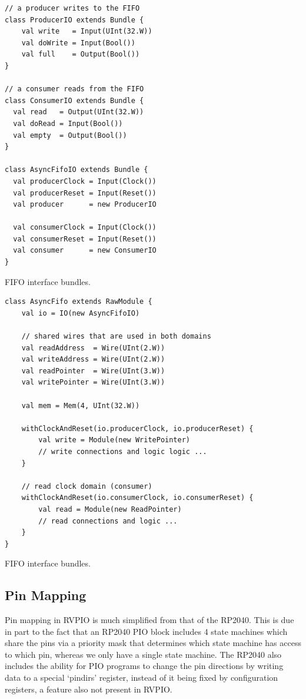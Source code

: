 \begin{listing}[h!]
    \vspace{0.5cm}
    \begin{verbatim}
// a producer writes to the FIFO
class ProducerIO extends Bundle {
    val write   = Input(UInt(32.W))
    val doWrite = Input(Bool())
    val full    = Output(Bool())
}

// a consumer reads from the FIFO
class ConsumerIO extends Bundle {
  val read   = Output(UInt(32.W))
  val doRead = Input(Bool())
  val empty  = Output(Bool())
}

class AsyncFifoIO extends Bundle {
  val producerClock = Input(Clock())
  val producerReset = Input(Reset())
  val producer      = new ProducerIO

  val consumerClock = Input(Clock())
  val consumerReset = Input(Reset())
  val consumer      = new ConsumerIO
}
    \end{verbatim}
    \caption{FIFO interface bundles.}
    \label{lst:fifobundles}
\end{listing}


\begin{listing}[h!]
    \vspace{0.5cm}
    \begin{verbatim}
class AsyncFifo extends RawModule {
    val io = IO(new AsyncFifoIO)
    
    // shared wires that are used in both domains
    val readAddress  = Wire(UInt(2.W))
    val writeAddress = Wire(UInt(2.W))
    val readPointer  = Wire(UInt(3.W))
    val writePointer = Wire(UInt(3.W))
    
    val mem = Mem(4, UInt(32.W))
    
    withClockAndReset(io.producerClock, io.producerReset) {
        val write = Module(new WritePointer)
        // write connections and logic logic ...
    }
    
    // read clock domain (consumer)
    withClockAndReset(io.consumerClock, io.consumerReset) {
        val read = Module(new ReadPointer)
        // read connections and logic ...
    }
}
    \end{verbatim}
    \caption{FIFO interface bundles.}
    \label{lst:fifo}
\end{listing}

\subsection{Pin Mapping}

Pin mapping in RVPIO is much simplified from that of the RP2040. This is due in part to the fact that an RP2040 PIO block includes 4 state machines which share the pins via a priority mask that determines which state machine has access to which pin, whereas we only have a single state machine. The RP2040 also includes the ability for PIO programs to change the pin directions by writing data to a special `pindirs' register, instead of it being fixed by configuration registers, a feature also not present in RVPIO.

